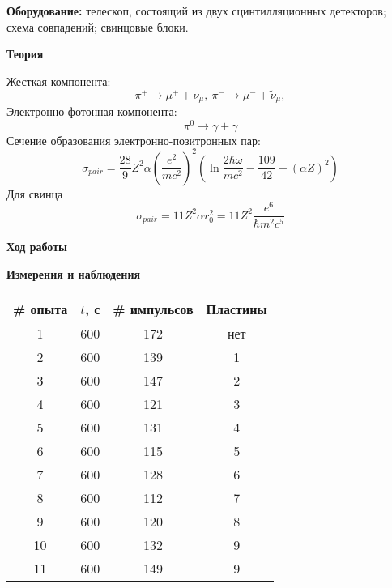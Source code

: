 \documentclass[12pt]{article}
\begin{document}
\parindent=1cm \textbf{Оборудование:} телескоп, состоящий из двух
сцинтилляционных детекторов; схема совпадений; свинцовые блоки.
\begin{center}
    \textbf{Теория}
\end{center}
Жесткая компонента:
\begin{equation}
    \label{eq:(1)}
    \pi^+ \to \mu^+ + \nu_\mu, \  \pi^- \to \mu^- + \tilde{\nu}_\mu,
\end{equation}
Электронно-фотонная компонента:
\begin{equation}
    \label{eq:(2)}
    \pi^0 \to \gamma + \gamma
\end{equation}
Сечение образования электронно-позитронных пар:
\begin{equation}
    \label{eq:(3)}
    \sigma_{pair} = \frac{28}{9}Z^2\alpha \left(\frac{e^2}{mc^2}\right)^2\left(\ln\frac{2\hbar \omega}{mc^2} - \frac{109}{42} - \left(\alpha Z\right)^2\right)
\end{equation}
Для свинца
\begin{equation}
    \label{eq:(3)}
    \sigma_{pair} =11Z^2\alpha r_0^2 = 11Z^2\frac{e^6}{\hbar m^2 c^5}
\end{equation}
\newpage
\begin{center}
    \textbf{Ход работы}
\end{center}
\begin{center}
    \textbf{Измерения и наблюдения}
\end{center}
\begin{center}
    \begin{tabular}{|c|c|c|c|}
      \hline
      \# опыта & $t$, с & \# импульсов & Пластины \\ \hline
      1 & 600 & 172 & нет \\ \hline
      2 & 600 & 139 & 1 \\ \hline
      3 & 600 & 147 & 2 \\ \hline
      4 & 600 & 121 & 3 \\ \hline
      5 & 600 & 131 & 4 \\ \hline
      6 & 600 & 115 & 5 \\ \hline
      7 & 600 & 128 & 6 \\ \hline
      8 & 600 & 112 & 7 \\ \hline
      9 & 600 & 120 & 8 \\ \hline
      10 & 600 & 132 & 9 \\ \hline
      11 & 600 & 149 & 9 \\ \hline
   \end{tabular}
\end{center}
\end{document}
